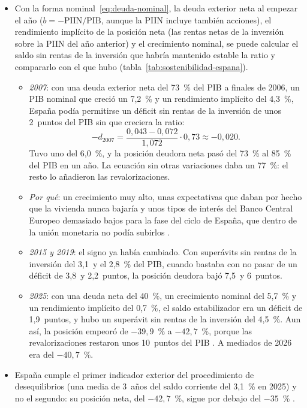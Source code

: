 \documentclass[11pt]{article}
\begin{document}
\begin{itemize}
\item Con la forma nominal~\eqref{eq:deuda-nominal}, la deuda exterior neta al empezar el año ($b=-\mathrm{PIIN}/\mathrm{PIB}$, aunque la PIIN incluye también acciones), el rendimiento implícito de la posición neta (las rentas netas de la inversión sobre la PIIN del año anterior) y el crecimiento nominal, se puede calcular el saldo sin rentas de la inversión que habría mantenido estable la ratio y compararlo con el que hubo (tabla~\ref{tab:sostenibilidad-espana}).
  \begin{itemize}
  \item \emph{2007}: con una deuda exterior neta del 73~\% del PIB a finales de 2006, un PIB nominal que creció un 7,2~\% y un rendimiento implícito del 4,3~\%, España podía permitirse un déficit sin rentas de la inversión de unos 2~puntos del PIB sin que creciera la ratio:
    \[
    -d_{2007}=\frac{0{,}043-0{,}072}{1{,}072}\cdot0{,}73\approx-0{,}020 .
    \]
    Tuvo uno del 6,0~\%, y la posición deudora neta pasó del 73~\% al 85~\% del PIB en un año. La ecuación sin otras variaciones daba un 77~\%: el resto lo añadieron las revalorizaciones\nocite{BdE2026BE17,Eurostat2026MIPExterior,Eurostat2026bopc6a,Eurostat2026nama10gdp}.
  \item \emph{Por qué}: un crecimiento muy alto, unas expectativas que daban por hecho que la vivienda nunca bajaría y unos tipos de interés del Banco Central Europeo demasiado bajos para la fase del ciclo de España, que dentro de la unión monetaria no podía subirlos .
  \item \emph{2015 y 2019}: el signo ya había cambiado. Con superávits sin rentas de la inversión del 3,1~y el 2,8~\% del PIB, cuando bastaba con no pasar de un déficit de 3,8~y 2,2~puntos, la posición deudora bajó 7,5~y 6~puntos\nocite{BdE2026BE17,Eurostat2026MIPExterior}.
  \item \emph{2025}: con una deuda neta del 40~\%, un crecimiento nominal del 5,7~\% y un rendimiento implícito del 0,7~\%, el saldo estabilizador era un déficit de 1,9~puntos, y hubo un superávit sin rentas de la inversión del 4,5~\%. Aun así, la posición empeoró de $-39{,}9$~\% a $-42{,}7$~\%, porque las revalorizaciones restaron unos 10~puntos del PIB\nocite{BdE2026BE17,BdE2026PII2T} . A mediados de 2026 era del $-40{,}7$~\%.
  \end{itemize}
\item España cumple el primer indicador exterior del procedimiento de desequilibrios (una media de 3~años del saldo corriente del 3,1~\% en 2025) y no el segundo: su posición neta, del $-42{,}7$~\%, sigue por debajo del $-35$~\%\nocite{Eurostat2026MIPExterior}  .
\end{itemize}
\end{document}
